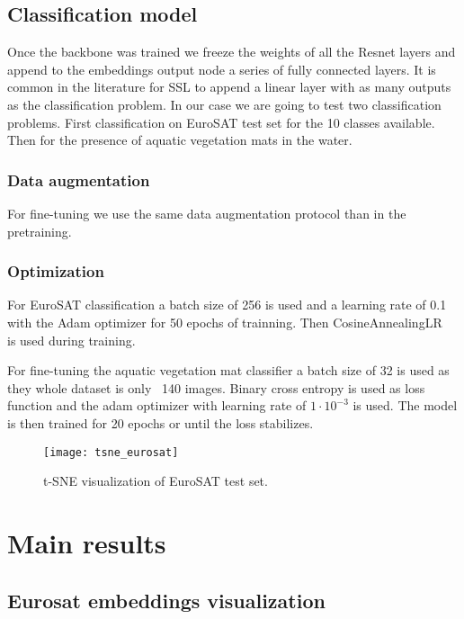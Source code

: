 \documentclass[conference]{IEEEtran}
\begin{document}
    \subsection{Classification model}
    Once the backbone was trained we freeze the weights of all the Resnet layers and append to the embeddings output node a series of fully connected layers.
    It is common in the literature for SSL to append a linear layer with as many outputs as the classification problem.
    In our case we are going to test two classification problems.
    First classification on EuroSAT test set for the 10 classes available.
    Then for the presence of aquatic vegetation mats in the water.

    \subsubsection{Data augmentation}
    For fine-tuning we use the same data augmentation protocol than in the pretraining.

    \subsubsection{Optimization}
    For EuroSAT classification a batch size of 256 is used and a learning rate of 0.1 with the Adam optimizer for 50 epochs of trainning.
    Then CosineAnnealingLR~\cite{loshchilov2017sgdr} is used during training.

    For fine-tuning the aquatic vegetation mat classifier a batch size of 32 is used as they whole dataset is only ~140 images.
    Binary cross entropy is used as loss function and the adam optimizer with learning rate of $1\cdot10^{-3}$ is used.
    The model is then trained for 20 epochs or until the loss stabilizes.


    \begin{figure}[h]
        \centering
        \texttt{[image: tsne\_eurosat]}
        \caption{t-SNE visualization of EuroSAT test set.}
        \label{fig:tsne_eurosat}
    \end{figure}


    \section{Main results}

    \subsection{Eurosat embeddings visualization}
\end{document}

